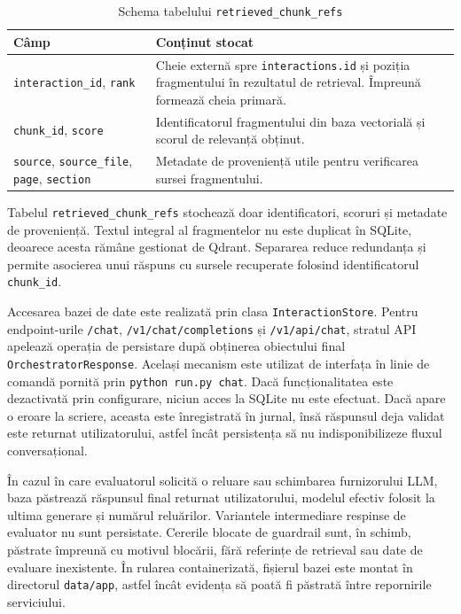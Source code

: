 \documentclass[12pt, a4paper, oneside, romanian]{teza-upb}
\begin{document}
\begin{table}[H]
\centering
\caption{Schema tabelului \texttt{retrieved\_chunk\_refs}}
\begin{tabular}{|p{4cm}|p{9.2cm}|}
\hline
\textbf{Câmp} & \textbf{Conținut stocat} \\
\hline
\texttt{interaction\_id}, \texttt{rank} & Cheie externă spre \texttt{interactions.id} și poziția fragmentului în rezultatul de retrieval. Împreună formează cheia primară. \\
\hline
\texttt{chunk\_id}, \texttt{score} & Identificatorul fragmentului din baza vectorială și scorul de relevanță obținut. \\
\hline
\texttt{source}, \texttt{source\_file}, \texttt{page}, \texttt{section} & Metadate de proveniență utile pentru verificarea sursei fragmentului. \\
\hline
\end{tabular}
\label{tab:retrieved-chunk-storage}
\end{table}

Tabelul \texttt{retrieved\_chunk\_refs} stochează doar identificatori, scoruri și metadate de proveniență. Textul integral al fragmentelor nu este duplicat în SQLite, deoarece acesta rămâne gestionat de Qdrant. Separarea reduce redundanța și permite asocierea unui răspuns cu sursele recuperate folosind identificatorul \texttt{chunk\_id}.

Accesarea bazei de date este realizată prin clasa \texttt{InteractionStore}. Pentru endpoint-urile \texttt{/chat}, \texttt{/v1/chat/completions} și \texttt{/v1/api/chat}, stratul API apelează operația de persistare după obținerea obiectului final \texttt{OrchestratorResponse}. Același mecanism este utilizat de interfața în linie de comandă pornită prin \texttt{python run.py chat}. Dacă funcționalitatea este dezactivată prin configurare, niciun acces la SQLite nu este efectuat. Dacă apare o eroare la scriere, aceasta este înregistrată în jurnal, însă răspunsul deja validat este returnat utilizatorului, astfel încât persistența să nu indisponibilizeze fluxul conversațional.

În cazul în care evaluatorul solicită o reluare sau schimbarea furnizorului LLM, baza păstrează răspunsul final returnat utilizatorului, modelul efectiv folosit la ultima generare și numărul reluărilor. Variantele intermediare respinse de evaluator nu sunt persistate. Cererile blocate de guardrail sunt, în schimb, păstrate împreună cu motivul blocării, fără referințe de retrieval sau date de evaluare inexistente. În rularea containerizată, fișierul bazei este montat în directorul \texttt{data/app}, astfel încât evidența să poată fi păstrată între repornirile serviciului.
\end{document}
